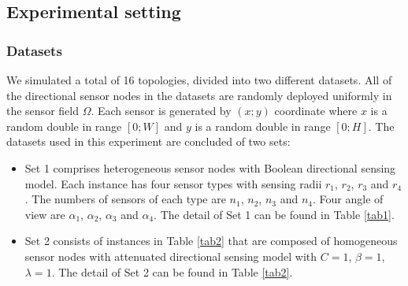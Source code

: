 \documentclass[final]{elsarticle}
\begin{document}
\subsection{Experimental setting}
\subsubsection{Datasets}
We simulated a total of 16 topologies, divided into two different datasets. All of the directional sensor nodes in the datasets are randomly deployed uniformly in the sensor field $ \Omega $. Each sensor is generated by $ (x; y) $ coordinate where $ x $ is a random double in range $ [0; W ] $ and $ y 
$ is a random double in range $ [0; H] $.
The datasets used in this experiment are concluded of two sets: 
\begin{itemize}
	\item Set 1 comprises heterogeneous sensor nodes with Boolean directional sensing model. Each instance has four sensor types with sensing radii $ r_1 $, $ r_2 $, $ r_3 $ and $ r_4 $. The numbers of sensors of each type are $ n_1 $, $ n_2 $, $ n_3 $ and $ n_4 $. Four angle of view are $ \alpha_1 $, $ \alpha_2 $, $ \alpha_3 $ and $ \alpha_4 $. The detail of Set 1 can be found in Table \ref{tab1}.
	\item Set 2 consists of instances in Table \ref{tab2} that are composed of homogeneous sensor nodes with attenuated directional sensing model with $C=1$, $\beta =1$, $\lambda =1$. The detail of Set 2 can be found in Table \ref{tab2}.
\end{itemize}
\begin{table}
	\caption{Experiment Instance for heterogeneous- Dataset 1}
	\label{tab1}       %
	\begin{center}
		\renewcommand{\arraystretch}{1.3}
	\end{center}
\end{table}
\end{document}
